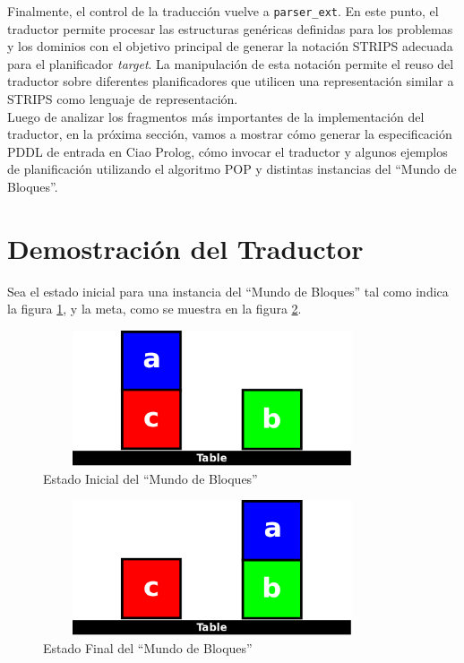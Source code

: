 Finalmente, el control de la traducci\'on vuelve a \texttt{parser\_ext}. 
En este punto, el traductor permite procesar las estructuras
gen\'ericas definidas para los problemas y los dominios con el
objetivo principal de generar la notaci\'on STRIPS adecuada para el
planificador \emph{target}.
La manipulaci\'on de esta notaci\'on permite el reuso del traductor
sobre diferentes planificadores que utilicen una representaci\'on
similar a STRIPS como lenguaje de representaci\'on.
\ \\

Luego de analizar los fragmentos m\'as importantes de la
implementaci\'on del traductor, en la pr\'oxima secci\'on, vamos a
mostrar c\'omo generar la especificaci\'on PDDL de entrada en Ciao Prolog, c\'omo
invocar el traductor y algunos ejemplos de planificaci\'on utilizando
el algoritmo POP y distintas instancias del ``Mundo de Bloques''. 

   \section{Demostraci\'on del Traductor} \label{cap6:ejemplos}

   Sea el estado inicial para una instancia del ``Mundo de
   Bloques'' tal como indica la figura \ref{demo:estadoInicial}, y la
   meta, como se muestra en la figura \ref{demo:estadoFinal}.

  \begin{figure}[h!]
  \centering
  \includegraphics[width=10cm,height=4cm]{bkwInicial.png} 
       \caption{Estado Inicial del ``Mundo de Bloques''}
	\label{demo:estadoInicial}
   \end{figure} 

  \begin{figure}[h!]
  \centering
  \includegraphics[width=10cm,height=4cm]{bkwFinal.png} 
       \caption{Estado Final del ``Mundo de Bloques''}
	\label{demo:estadoFinal}
  \end{figure}  

